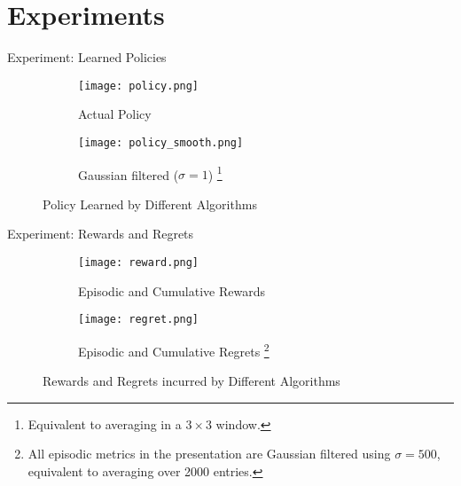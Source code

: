 \section{Experiments}

\begin{frame}{Experiment: Learned Policies}
\begin{figure}
    \centering
    \begin{subfigure}{\textwidth}
        \centering
        \texttt{[image: policy.png]}
        \caption{Actual Policy}
    \end{subfigure}
    \begin{subfigure}{\textwidth}
        \centering
        \texttt{[image: policy\_smooth.png]}
        \caption{Gaussian filtered ($\sigma = 1$) \footnote{Equivalent to averaging in a $3 \times 3$ window.}}
    \end{subfigure}
    \caption{Policy Learned by Different Algorithms}
\end{figure}
\end{frame}

\begin{frame}{Experiment: Rewards and Regrets}
\begin{figure}
    \centering
    \begin{subfigure}{\textwidth}
        \centering
        \texttt{[image: reward.png]}
        \caption{Episodic and Cumulative Rewards}
    \end{subfigure}
    \begin{subfigure}{\textwidth}
        \centering
        \texttt{[image: regret.png]}
        \caption{Episodic and Cumulative Regrets \footnote{All episodic metrics in the presentation are Gaussian filtered using $\sigma = 500$, equivalent to averaging over 2000 entries.}}
    \end{subfigure}
    \caption{Rewards and Regrets incurred by Different Algorithms}
\end{figure}
\end{frame}

